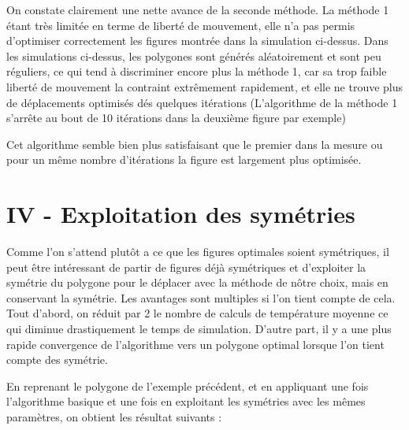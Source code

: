 \documentclass[a4paper,reqno]{article}
\newcommand{\pa}{\hspace{1cm}}
\begin{document}
\par On constate clairement une nette avance de la seconde méthode. La méthode 1 étant très limitée en terme de liberté de mouvement, elle n'a pas permis d'optimiser correctement les figures montrée dans la simulation ci-dessus. Dans les simulations ci-dessus, les polygones sont générés aléatoirement et sont peu réguliers, ce qui tend à discriminer encore plus la méthode 1, car sa trop faible liberté de mouvement la contraint extrêmement rapidement, et elle ne trouve plus de déplacements optimisés dés quelques itérations (L'algorithme de la méthode 1 s'arrête au bout de 10 itérations dans la deuxième figure par exemple)\\ 

\par Cet algorithme semble bien plus satisfaisant que le premier dans la mesure ou pour un même nombre d'itérations la figure est largement plus optimisée.



\section*{IV - Exploitation des symétries}

\pa Comme l'on s'attend plutôt a ce que les figures optimales soient symétriques, il peut être intéressant de partir de figures déjà symétriques et d'exploiter la symétrie du polygone pour le déplacer avec la méthode de nôtre choix, mais en conservant la symétrie. Les avantages sont multiples si l'on tient compte de cela. Tout d'abord, on réduit par 2 le nombre de calculs de température moyenne ce qui diminue drastiquement le temps de simulation. D'autre part, il y a une plus rapide convergence de l'algorithme vers un polygone optimal lorsque l'on tient compte des symétrie. \\ 

\par En reprenant le polygone de l'exemple précédent, et en appliquant une fois l'algorithme basique et une fois en exploitant les symétries avec les mêmes paramètres, on obtient les résultat suivants : \\ 
\end{document}
